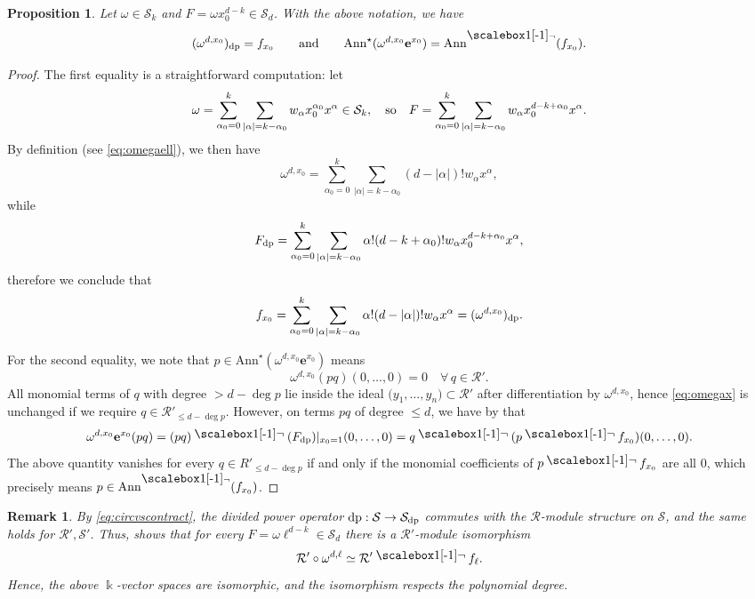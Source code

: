 \documentclass{amsart}
\theoremstyle{plain}
\newtheorem{proposition}[proposition]{Proposition}
\newtheorem{remark}[remark]{Remark}
\renewcommand{\k}{\Bbbk}
\renewcommand{\S}{\mathcal{S}}
\newcommand{\Ann}{\textnormal{Ann}}
\def\a{\alpha}
\newcommand{\ideal}[1]{\mathopen{}\bigl( #1 \bigr)\mathclose{}}
\newcommand{\contract}{\mathbin{\mathpalette\dointprod\relax}}
\newcommand{\dointprod}[2]{%
  \raisebox{\depth}{\scalebox{1}[-1]{$#1\lnot$}}}
\def\R{\mathcal{R}}
\def\Ann{\mathrm{Ann}}
\numberwithin{equation}{section}
\begin{document}
\begin{proposition} \label{prop:equivgenerators}
    Let $\omega \in \S_k$ and $F = \omega x_0^{d-k} \in \S_d$. With the above notation, we have
    \[ (\omega^{d,x_0})_{\rm dp} = f_{x_0} \qquad \textnormal{and} \qquad  \Ann^{\star}( \omega^{d,x_0} \mathbf{e}^{x_0} ) = \Ann^{\contract}( f_{x_0} ). \]
\end{proposition}
\begin{proof}
    The first equality is a straightforward computation: let 
    \[ \omega = \sum_{\a_0=0}^k\sum_{|\a| = k - \a_0} w_{\a} x_0^{\a_0} x^{\a} \in \S_k, \quad \textnormal{so} \quad F = \sum_{\a_0=0}^k\sum_{|\a| = k - \a_0} w_{\a} x_0^{d-k+\a_0} x^{\a}. \]
    By definition (see \cref{eq:omegaell}), we then have
    \[ \omega^{d,x_0} = \sum_{\a_0=0}^k \sum_{|\a| = k - \a_0} (d-|\a|)! w_{\a} x^{\a}, \]
    while
    \[ F_{\rm dp} = \sum_{\a_0=0}^k\sum_{|\a| = k - \a_0} \a!(d-k+\a_0)! w_{\a} x_0^{d-k+\a_0} x^{\a}, \]
    therefore we conclude that
    \[ f_{x_0} = \sum_{\a_0=0}^k\sum_{|\a| = k - \a_0} \a!(d-|\a|)! w_{\a} x^{\a} = (\omega^{d,x_0})_{\rm dp}. \]
    
    For the second equality, we note that $p \in \Ann^{\star}( \omega^{d,x_0} \mathbf{e}^{x_0} )$ means
    \begin{equation} \label{eq:omegax}
        \omega^{d,x_0}(pq)(0, \dots,0) = 0 \quad \forall \, q \in \R'.
    \end{equation} 
    All monomial terms of $q$ with degree $> d-\deg p$ lie inside the ideal $\ideal{y_1, \dots, y_n} \subset \R'$ after differentiation by $\omega^{d,x_0}$, hence \cref{eq:omegax} is unchanged if we require $q \in \R'_{\leq d-\deg p}$.
    However, on terms $pq$ of degree $\leq d$, we have by \cite[Remark 2.4 and Lemma 2.5]{BMT25} that
    \[ \omega^{d,x_0} \mathbf{e}^{x_0} (pq) = (pq) \contract (F_{\rm dp})|_{x_0=1}(0, \dots, 0) = q \contract ( p \contract f_{x_0} )(0, \dots, 0). \]
    The above quantity vanishes for every $q \in R'_{\leq d-\deg p}$ if and only if the monomial coefficients of $p \contract f_{x_0}$ are all $0$, which precisely means $p \in \Ann^{\contract}( f_{x_0} )$.
\end{proof}

\begin{remark} \label{rmk:diminvsys}
    By \cref{eq:circvscontract}, the divided power operator ${\rm dp} : \S \to \S_{\rm dp}$ commutes with the $\R$-module structure on $\S$, and the same holds for $\R', \S'$.
    Thus,  shows that for every $F = \omega \ell^{d-k} \in \S_d$ there is a $\R'$-module isomorphism
    \[ \R' \circ \omega^{d,\ell} \simeq \R' \contract f_{\ell}. \]
    Hence, the above $\k$-vector spaces are isomorphic, and the isomorphism respects the polynomial degree.
\end{remark}
\end{document}
